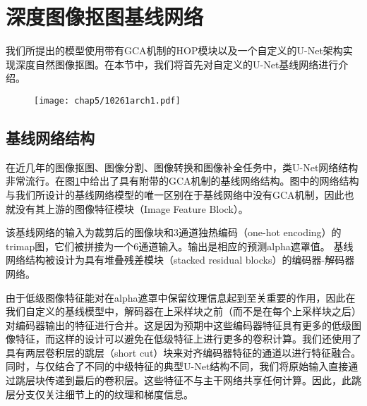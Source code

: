 \section{深度图像抠图基线网络}
我们所提出的模型使用带有GCA机制的HOP模块以及一个自定义的U-Net\cite{ronneberger2015u}架构实现深度自然图像抠图。在本节中，我们将首先对自定义的U-Net基线网络进行介绍。

\begin{figure}[t]
	\centering
	\texttt{[image: chap5/10261arch1.pdf]}
	\label{fig5:arch}
\end{figure}

\subsection{基线网络结构}
在近几年的图像抠图\cite{lutz2018alphagan,samplenet,lu2019indices}、图像分割\cite{long2015fully}、图像转换\cite{isola2017image}和图像补全\cite{liu2018image}任务中，类U-Net网络结构非常流行。在图\ref{fig5:arch}中给出了具有附带的GCA机制的基线网络结构。图中的网络结构与我们所设计的基线网络模型的唯一区别在于基线网络中没有GCA机制，因此也就没有其上游的图像特征模块（Image Feature Block）。

该基线网络的输入为裁剪后的图像块和3通道独热编码（one-hot encoding）的trimap图，它们被拼接为一个6通道输入。输出是相应的预测alpha遮罩值。
基线网络结构被设计为具有堆叠残差模块（stacked residual blocks）\cite{he2016deep}的编码器-解码器网络。

由于低级图像特征能对在alpha遮罩中保留纹理信息起到至关重要的作用，因此在我们自定义的基线模型中，解码器在上采样块之前（而不是在每个上采样块之后）对编码器输出的特征进行合并。这是因为预期中这些编码器特征具有更多的低级图像特征，而这样的设计可以避免在低级特征上进行更多的卷积计算。我们还使用了具有两层卷积层的跳层（short cut）块来对齐编码器特征的通道以进行特征融合。同时，与仅结合了不同的中级特征的典型U-Net结构不同，我们将原始输入直接通过跳层块传递到最后的卷积层。这些特征不与主干网络共享任何计算。因此，此跳层分支仅关注细节上的的纹理和梯度信息。

